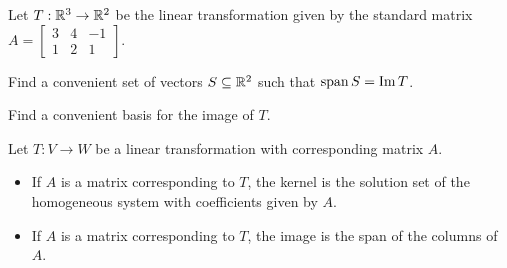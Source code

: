 \begin{applicationActivities}{2}{18}
\begin{activity}{10}
Let $T: \mathbb{R}^3 \rightarrow \mathbb{R}^2$ be the linear transformation given by the standard matrix $A=\begin{bmatrix} 3 & 4 & -1 \\ 1 & 2 & 1 \end{bmatrix}$.
\begin{subactivity}
Find a convenient set of vectors \(S\subseteq\mathbb{R}^2\) such that \(\operatorname{span} S=\operatorname{Im} T\).
\end{subactivity}
\begin{subactivity}
Find a convenient basis for the image of $T$.
\end{subactivity}
\end{activity}

\begin{observation}
Let $T: V \rightarrow W$ be a linear transformation with corresponding matrix $A$.

\begin{itemize}
\item If $A$ is a matrix corresponding to $T$, the kernel is the solution set of the homogeneous system with coefficients given by $A$.
\item If $A$ is a matrix corresponding to $T$, the image is the span of the columns of $A$.
\end{itemize}
\end{observation}

\end{applicationActivities}
